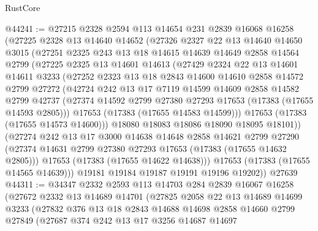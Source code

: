 \begin{lexlean}{RustCore}
\begin{coremodule}
@44241 := @27215
    @2328
    @2594
    @113
    @14654
    @231
    @2839
    @16068
    @16258
    (@27225
      @2328
      @13
      @14640
      @14652
      (@27326
        @2327
        @22
        @13
        @14640
        @14650
        @3015
        (@27251
          @2325
          @243
          @13
          @18
          @14615
          @14639
          @14649
          @2858
          @14564
          @2799
          (@27225
            @2325
            @13
            @14601
            @14613
            (@27429
              @2324
              @22
              @13
              @14601
              @14611
              @3233
              (@27252
                @2323
                @13
                @18
                @2843
                @14600
                @14610
                @2858
                @14572
                @2799
                @27272
                (@42724
                  @242
                  @13
                  @17
                  @7119
                  @14599
                  @14609
                  @2858
                  @14582
                  @2799
                  @42737
                  (@27374 @14592 @2799 @27380 @27293 @17653 (@17383 (@17655 @14593 @2805)))
                  @17653
                  (@17383 (@17655 @14583 @14599)))
                @17653
                (@17383 (@17655 @14573 @14600)))
              @18080
              @18083
              @18086
              @18090
              @18095
              @18101))
          (@27274
            @242
            @13
            @17
            @3000
            @14638
            @14648
            @2858
            @14621
            @2799
            @27290
            (@27374 @14631 @2799 @27380 @27293 @17653 (@17383 (@17655 @14632 @2805)))
            @17653
            (@17383 (@17655 @14622 @14638)))
          @17653
          (@17383 (@17655 @14565 @14639)))
        @19181
        @19184
        @19187
        @19191
        @19196
        @19202))
    @27639
@44311 := @34347
    @2332
    @2593
    @113
    @14703
    @284
    @2839
    @16067
    @16258
    (@27672
      @2332
      @13
      @14689
      @14701
      (@27825
        @2058
        @22
        @13
        @14689
        @14699
        @3233
        (@27832
          @376
          @13
          @18
          @2843
          @14688
          @14698
          @2858
          @14660
          @2799
          @27849
          (@27687
            @374
            @242
            @13
            @17
            @3256
            @14687
            @14697

\end{coremodule}
\end{lexlean}
